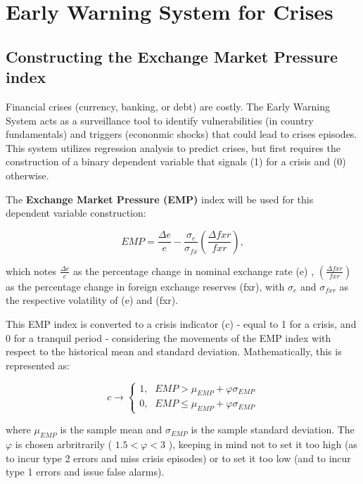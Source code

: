 \documentclass[12pt]{article}
\begin{document}
\section{Early Warning System for Crises}
\subsection{Constructing the Exchange Market Pressure index}

Financial crises (currency, banking, or debt) are costly. The Early Warning System acts as a surveillance tool to identify vulnerabilities (in country fundamentals) and triggers (econonmic shocks) that could lead to crises episodes. This system utilizes regression analysis to predict crises, but first requires the construction of a binary dependent variable that signals (1) for a crisis and (0) otherwise.

\noindent \: \: The \textbf{Exchange Market Pressure (EMP)} index will be used for this dependent variable construction:

$$EMP = \frac{\Delta e}{e} - \frac{\sigma_{e}}{\sigma_{fx}} \left(\frac{\Delta fxr}{fxr}\right),$$

\noindent which notes $\frac{\Delta e}{e}$ as the percentage change in nominal exchange rate (e) , $\left(\frac{\Delta fxr}{fxr}\right)$ as the percentage change in foreign exchange reserves (fxr), with $\sigma_{e}$ and $\sigma_{fxr}$ as the respective volatility of (e) and (fxr). 

\noindent This EMP index is converted to a crisis indicator (c) - equal to 1 for a crisis, and 0 for a tranquil period - considering the movements of the EMP index with respect to the historical mean and standard deviation. Mathematically, this is represented as:

  \begin{equation*}
   c \rightarrow
        \begin{cases}
            \text{1}, & EMP > \mu_{EMP} + \varphi \sigma_{EMP} \\
            \text{0},  & EMP \leq \mu_{EMP} + \varphi \sigma_{EMP}
        \end{cases}
    \end{equation*}

where $\mu_{EMP}$ is the sample mean and $\sigma_{EMP}$ is the sample standard deviation. The $\varphi$ is chosen arbritrarily ( $1.5<\varphi <3$ ), keeping in mind not to set it too high (as to incur type 2 errors and miss crisis episodes) or to set it too low (and to incur type 1 errors and issue false alarms). 
\end{document}
